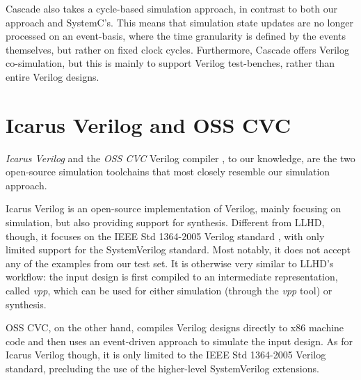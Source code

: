 Cascade also takes a cycle-based simulation approach, in contrast to both our approach and SystemC's. This means that simulation state updates are no longer processed on an event-basis, where the time granularity is defined by the events themselves, but rather on fixed clock cycles. Furthermore, Cascade offers Verilog co-simulation, but this is mainly to support Verilog test-benches, rather than entire Verilog designs.


\section{Icarus Verilog and OSS CVC}
\textit{Icarus Verilog} \cite{icarus} and the \textit{OSS CVC} Verilog compiler \cite{Meyer2016}, to our knowledge, are the two open-source simulation toolchains that most closely resemble our simulation approach.

Icarus Verilog is an open-source implementation of Verilog, mainly focusing on simulation, but also providing support for synthesis. Different from LLHD, though, it focuses on the IEEE Std 1364-2005 Verilog standard \cite{V2006}, with only limited support for the SystemVerilog standard. Most notably, it does not accept any of the examples from our test set. It is otherwise very similar to LLHD's workflow: the input design is first compiled to an intermediate representation, called \textit{vpp}, which can be used for either simulation (through the \textit{vpp} tool) or synthesis.

OSS CVC, on the other hand, compiles Verilog designs directly to x86 machine code and then uses an event-driven approach to simulate the input design. As for Icarus Verilog though, it is only limited to the IEEE Std 1364-2005 Verilog standard, precluding the use of the higher-level SystemVerilog extensions.
